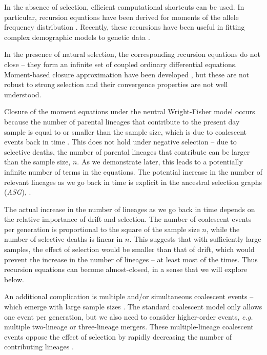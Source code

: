 \documentclass[review]{elsarticle}
\begin{document}
In the absence of selection, efficient computational shortcuts can be used. In particular, recursion
equations have been derived for moments of the allele frequency distribution
\citep{KimuraCrow1964,Ewens1972,JouganousEtAl2017}. Recently, these recursions have been useful in
fitting complex demographic models to genetic data \citep{JouganousEtAl2017,KammEtAl2017}.
 
In the presence of natural selection, the corresponding recursion equations do not close
\citep{DonnellyKurtz1999, JouganousEtAl2017} -- they form an infinite set of coupled ordinary
differential equations. Moment-based closure approximation have been developed
\citep{JouganousEtAl2017}, but these are not robust to strong selection and their convergence
properties are not well understood.

Closure of the moment equations under the neutral Wright-Fisher model occurs because the number of
parental lineages that contribute to the present day sample is equal to or smaller than the sample
size, which is due to coalescent events back in time \citep{Kingman1982a}. This does not hold under
negative selection -- due to selective deaths, the number of parental lineages that contribute can
be larger than the sample size, $n$. As we demonstrate later, this leads to a potentially infinite
number of terms in the equations. The potential increase in the number of relevant lineages as we go
back in time is explicit in the ancestral selection graphs (\textit{ASG}),
\citep{KroneNeuhauser1997}.

The actual increase in the number of lineages as we go back in time depends on the relative
importance of drift and selection. The number of coalescent events per generation is proportional to
the square of the sample size $n$, while the number of selective deaths is linear in $n$. This
suggests that with sufficiently large samples, the effect of selection would be smaller than that of
drift, which would prevent the increase in the number of lineages -- at least most of the times.
Thus recursion equations can become almost-closed, in a sense that we will explore below.

An additional complication is multiple and/or simultaneous coalescent events -- which emerge with
large sample sizes \citep{BhaskarEtAl2014}. The standard coalescent model only allows one event per
generation, but we also need to consider higher-order events, \textit{e.g.} multiple two-lineage or
three-lineage mergers. These multiple-lineage coalescent events oppose the effect of selection by
rapidly decreasing the number of contributing lineages \citep{NelsonEtAl2019}.
\end{document}
